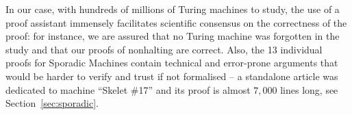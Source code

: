 \documentclass[letterpaper,british,11pt]{article}
\theoremstyle{definition} %
\numberwithin{equation}{section}
\theoremstyle{definition} %
\newcommand{\CoqBB}{Coq-BB5\xspace}
\begin{document}

In our case, with hundreds of millions of Turing machines to study, the use of a proof assistant immensely facilitates scientific consensus on the correctness of the proof: for instance, we are assured that no Turing machine was forgotten in the study and that our proofs of nonhalting are correct. Also, the 13 individual proofs for Sporadic Machines contain technical and error-prone arguments that would be harder to verify and trust if not formalised -- \eg a standalone article was dedicated to machine ``Skelet \#17'' \cite{xu2024skelet17fifthbusy} and its \Coq proof is almost $7{,}000$ lines long, see Section~\ref{sec:sporadic}.


\end{document}
